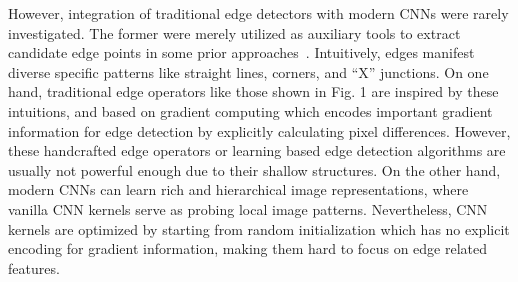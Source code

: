 \documentclass[10pt,twocolumn,letterpaper]{article}
\begin{document}
However, integration of traditional edge detectors with modern CNNs were rarely investigated. The former were merely utilized as auxiliary tools to extract candidate edge points in some prior approaches~\cite{bertasius2015hfl,bertasius2015deepedge}. Intuitively, edges manifest diverse specific patterns like straight lines, corners, and ``X'' junctions. On one hand, traditional edge operators like those shown in Fig. 1 are inspired by these intuitions, and based on gradient computing which encodes important gradient information for edge detection by explicitly calculating pixel differences. However, these handcrafted edge operators or learning based edge detection algorithms are usually not powerful enough due to their shallow structures. On the other hand, modern CNNs can learn rich and hierarchical image representations, where vanilla CNN kernels serve as probing local image patterns. Nevertheless, CNN kernels are optimized by starting from random initialization which has no explicit encoding for gradient information, making them hard to focus on edge related features.


\begin{table}[t!]
\caption{Comparison between ours and some leading edge detection models in terms of efficiency and accuracy. The multiply-accumulates (MACs) are calculated based on a 200$\times$200 image, FPS and ODS \emph{F-measure} are evaluated on the BSDS500 test set.}
\begin{center}
\setlength{\tabcolsep}{0.015\linewidth}
\end{center}
\label{table:table1}
\vspace{-0.2in}
\end{table}
\end{document}
